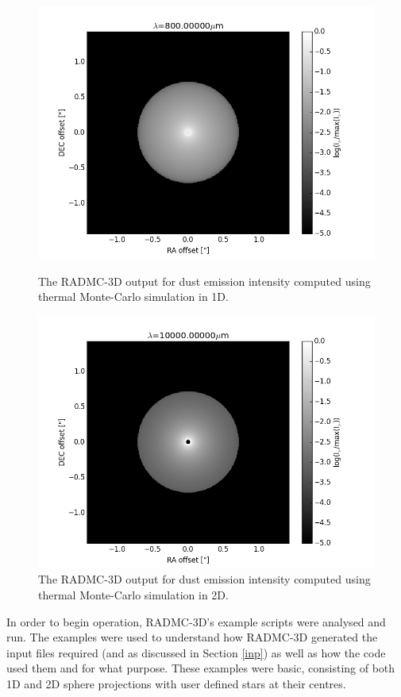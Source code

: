 \documentclass{report}
\begin{document}
\begin{figure}[!htb]
  \includegraphics[width=\linewidth]{../img/1d}
  \caption{The RADMC-3D output for dust emission intensity computed using thermal Monte-Carlo simulation in 1D.}\label{fig:1d}
\endminipage\hfill
{}
  \includegraphics[width=\linewidth]{../img/2d}
  \caption{The RADMC-3D output for dust emission intensity computed using thermal Monte-Carlo simulation in 2D.}\label{fig:2d}
\endminipage
\end{figure}

In order to begin operation, RADMC-3D's example scripts were analysed and run. The examples were used to understand how RADMC-3D generated the input files required (and as discussed in Section \ref{inp}) as well as how the code used them and for what purpose. These examples were basic, consisting of both 1D and 2D sphere projections with user defined stars at their centres.
\end{document}
